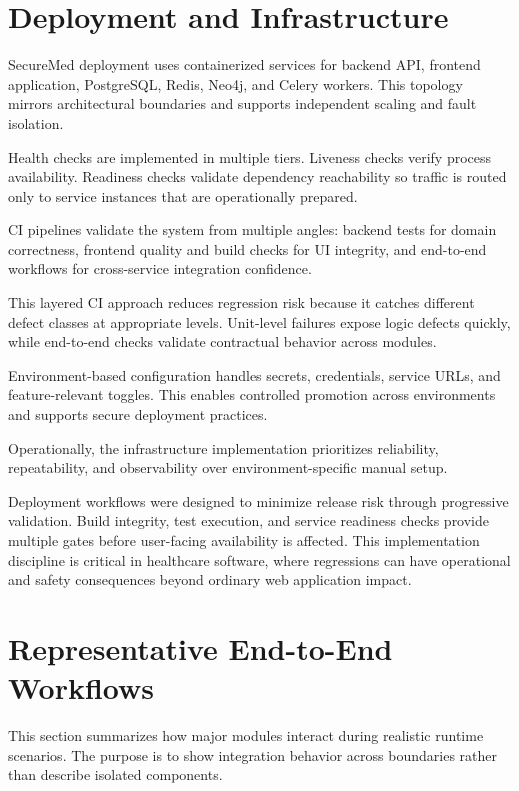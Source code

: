 \section{Deployment and Infrastructure}\label{515-deployment-and-infrastructure}

SecureMed deployment uses containerized services for backend API, frontend application, PostgreSQL, Redis, Neo4j, and Celery workers. This topology mirrors architectural boundaries and supports independent scaling and fault isolation.

Health checks are implemented in multiple tiers. Liveness checks verify process availability. Readiness checks validate dependency reachability so traffic is routed only to service instances that are operationally prepared.

CI pipelines validate the system from multiple angles: backend tests for domain correctness, frontend quality and build checks for UI integrity, and end-to-end workflows for cross-service integration confidence.

This layered CI approach reduces regression risk because it catches different defect classes at appropriate levels. Unit-level failures expose logic defects quickly, while end-to-end checks validate contractual behavior across modules.

Environment-based configuration handles secrets, credentials, service URLs, and feature-relevant toggles. This enables controlled promotion across environments and supports secure deployment practices.

Operationally, the infrastructure implementation prioritizes reliability, repeatability, and observability over environment-specific manual setup.

Deployment workflows were designed to minimize release risk through progressive validation. Build integrity, test execution, and service readiness checks provide multiple gates before user-facing availability is affected. This implementation discipline is critical in healthcare software, where regressions can have operational and safety consequences beyond ordinary web application impact.

\section{Representative End-to-End Workflows}\label{516-representative-end-to-end-workflows}

This section summarizes how major modules interact during realistic runtime scenarios. The purpose is to show integration behavior across boundaries rather than describe isolated components.


